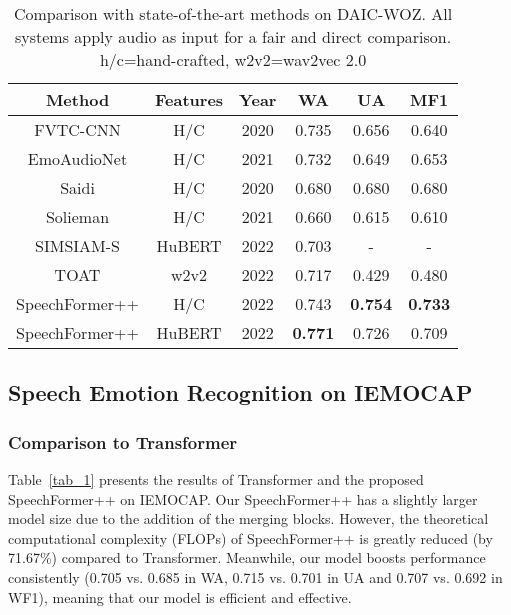 \documentclass[lettersize,journal]{IEEEtran}
\begin{document}
\begin{table}[t]
    \caption{Comparison with state-of-the-art methods on DAIC-WOZ. All systems apply audio as input for a fair and direct comparison. h/c=hand-crafted, w2v2=wav2vec 2.0}
    \label{tab_8}
    \centering
    \begin{threeparttable}
    \begin{tabular}{ccc||ccc}
    \hline
    Method   & Features  & Year & WA  & UA  & MF1        \\ \hline
    FVTC-CNN\cite{FVTC-CNN}  &  H/C  & 2020 & 0.735 & 0.656 & 0.640 \\
    EmoAudioNet\cite{EmoAudioNet} &  H/C & 2021 & 0.732 & 0.649 & 0.653 \\
    Saidi\cite{Saidi} &  H/C & 2020  & 0.680 & 0.680  & 0.680 \\
    Solieman\cite{Solieman} &  H/C & 2021 & 0.660 & 0.615 & 0.610 \\ 
    SIMSIAM-S\cite{daic_use_hubert} & HuBERT & 2022 & 0.703 & - & -  \\
    TOAT\cite{sota_w2v2_daic_1} & w2v2 & 2022 & 0.717 & 0.429 & 0.480 \\ \hline
    SpeechFormer++ & H/C  & 2022 & 0.743 & \textbf{0.754} & \textbf{0.733} \\
    SpeechFormer++ & HuBERT  & 2022 & \textbf{0.771} & 0.726 & 0.709 \\ \hline
    \end{tabular}
    \end{threeparttable}
\end{table}

\subsection{Speech Emotion Recognition on IEMOCAP}
\subsubsection{Comparison to Transformer} Table~\ref{tab_1} presents the results of Transformer and the proposed SpeechFormer++ on IEMOCAP. Our SpeechFormer++ has a slightly larger model size due to the addition of the merging blocks. However, the theoretical computational complexity (FLOPs) of SpeechFormer++ is greatly reduced (by 71.67\%) compared to Transformer. Meanwhile, our model boosts performance consistently (0.705 vs. 0.685 in WA, 0.715 vs. 0.701 in UA and 0.707 vs. 0.692 in WF1), meaning that our model is efficient and effective.
\end{document}
